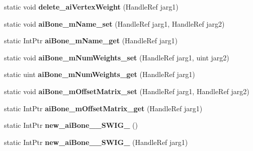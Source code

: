 \begin{DoxyCompactItemize}
\item 
\hypertarget{class_assimp_p_i_n_v_o_k_e_a1b5f4be5a52426786f1f0159b30281db}{static void {\bfseries delete\+\_\+ai\+Vertex\+Weight} (Handle\+Ref jarg1)}\label{class_assimp_p_i_n_v_o_k_e_a1b5f4be5a52426786f1f0159b30281db}

\item 
\hypertarget{class_assimp_p_i_n_v_o_k_e_a1deaaa15ec1481830dcf7457edf36cd7}{static void {\bfseries ai\+Bone\+\_\+m\+Name\+\_\+set} (Handle\+Ref jarg1, Handle\+Ref jarg2)}\label{class_assimp_p_i_n_v_o_k_e_a1deaaa15ec1481830dcf7457edf36cd7}

\item 
\hypertarget{class_assimp_p_i_n_v_o_k_e_a2b0184723cf931209f43f6fb9fd3eb77}{static Int\+Ptr {\bfseries ai\+Bone\+\_\+m\+Name\+\_\+get} (Handle\+Ref jarg1)}\label{class_assimp_p_i_n_v_o_k_e_a2b0184723cf931209f43f6fb9fd3eb77}

\item 
\hypertarget{class_assimp_p_i_n_v_o_k_e_a065a61ecd7a0f2da9c9fb836c5e1f877}{static void {\bfseries ai\+Bone\+\_\+m\+Num\+Weights\+\_\+set} (Handle\+Ref jarg1, uint jarg2)}\label{class_assimp_p_i_n_v_o_k_e_a065a61ecd7a0f2da9c9fb836c5e1f877}

\item 
\hypertarget{class_assimp_p_i_n_v_o_k_e_ab6efb20140419d88b31828bbee78b158}{static uint {\bfseries ai\+Bone\+\_\+m\+Num\+Weights\+\_\+get} (Handle\+Ref jarg1)}\label{class_assimp_p_i_n_v_o_k_e_ab6efb20140419d88b31828bbee78b158}

\item 
\hypertarget{class_assimp_p_i_n_v_o_k_e_a68c46f484863e2cf21ba8ad920369d61}{static void {\bfseries ai\+Bone\+\_\+m\+Offset\+Matrix\+\_\+set} (Handle\+Ref jarg1, Handle\+Ref jarg2)}\label{class_assimp_p_i_n_v_o_k_e_a68c46f484863e2cf21ba8ad920369d61}

\item 
\hypertarget{class_assimp_p_i_n_v_o_k_e_a5a27466b8b7d80e3a92523e5a95cf16c}{static Int\+Ptr {\bfseries ai\+Bone\+\_\+m\+Offset\+Matrix\+\_\+get} (Handle\+Ref jarg1)}\label{class_assimp_p_i_n_v_o_k_e_a5a27466b8b7d80e3a92523e5a95cf16c}

\item 
\hypertarget{class_assimp_p_i_n_v_o_k_e_a1bc9ee21665a92aed01644c908b25ff0}{static Int\+Ptr {\bfseries new\+\_\+ai\+Bone\+\_\+\+\_\+\+S\+W\+I\+G\+\_} ()}\label{class_assimp_p_i_n_v_o_k_e_a1bc9ee21665a92aed01644c908b25ff0}

\item 
\hypertarget{class_assimp_p_i_n_v_o_k_e_a3e37e7e06e54638e68743d7deb5d68b4}{static Int\+Ptr {\bfseries new\+\_\+ai\+Bone\+\_\+\+\_\+\+S\+W\+I\+G\+\_} (Handle\+Ref jarg1)}\label{class_assimp_p_i_n_v_o_k_e_a3e37e7e06e54638e68743d7deb5d68b4}


\end{DoxyCompactItemize}
